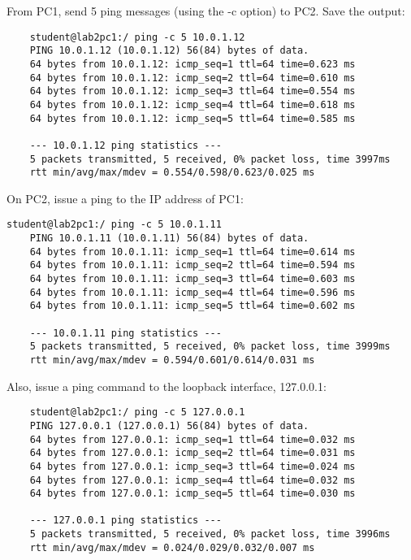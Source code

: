 From PC1, send 5 ping messages (using the -c option) to PC2. Save the output:
\begin{lstlisting}
	student@lab2pc1:/ ping -c 5 10.0.1.12
	PING 10.0.1.12 (10.0.1.12) 56(84) bytes of data.
	64 bytes from 10.0.1.12: icmp_seq=1 ttl=64 time=0.623 ms
	64 bytes from 10.0.1.12: icmp_seq=2 ttl=64 time=0.610 ms
	64 bytes from 10.0.1.12: icmp_seq=3 ttl=64 time=0.554 ms
	64 bytes from 10.0.1.12: icmp_seq=4 ttl=64 time=0.618 ms
	64 bytes from 10.0.1.12: icmp_seq=5 ttl=64 time=0.585 ms

	--- 10.0.1.12 ping statistics ---
	5 packets transmitted, 5 received, 0% packet loss, time 3997ms
	rtt min/avg/max/mdev = 0.554/0.598/0.623/0.025 ms
\end{lstlisting}

On PC2, issue a ping to the IP address of PC1:
\begin{lstlisting}
student@lab2pc1:/ ping -c 5 10.0.1.11
	PING 10.0.1.11 (10.0.1.11) 56(84) bytes of data.
	64 bytes from 10.0.1.11: icmp_seq=1 ttl=64 time=0.614 ms
	64 bytes from 10.0.1.11: icmp_seq=2 ttl=64 time=0.594 ms
	64 bytes from 10.0.1.11: icmp_seq=3 ttl=64 time=0.603 ms
	64 bytes from 10.0.1.11: icmp_seq=4 ttl=64 time=0.596 ms
	64 bytes from 10.0.1.11: icmp_seq=5 ttl=64 time=0.602 ms

	--- 10.0.1.11 ping statistics ---
	5 packets transmitted, 5 received, 0% packet loss, time 3999ms
	rtt min/avg/max/mdev = 0.594/0.601/0.614/0.031 ms
\end{lstlisting}

Also, issue a ping command to the loopback interface, 127.0.0.1:
\begin{lstlisting}
	student@lab2pc1:/ ping -c 5 127.0.0.1
	PING 127.0.0.1 (127.0.0.1) 56(84) bytes of data.
	64 bytes from 127.0.0.1: icmp_seq=1 ttl=64 time=0.032 ms
	64 bytes from 127.0.0.1: icmp_seq=2 ttl=64 time=0.031 ms
	64 bytes from 127.0.0.1: icmp_seq=3 ttl=64 time=0.024 ms
	64 bytes from 127.0.0.1: icmp_seq=4 ttl=64 time=0.032 ms
	64 bytes from 127.0.0.1: icmp_seq=5 ttl=64 time=0.030 ms

	--- 127.0.0.1 ping statistics ---
	5 packets transmitted, 5 received, 0% packet loss, time 3996ms
	rtt min/avg/max/mdev = 0.024/0.029/0.032/0.007 ms
\end{lstlisting}

